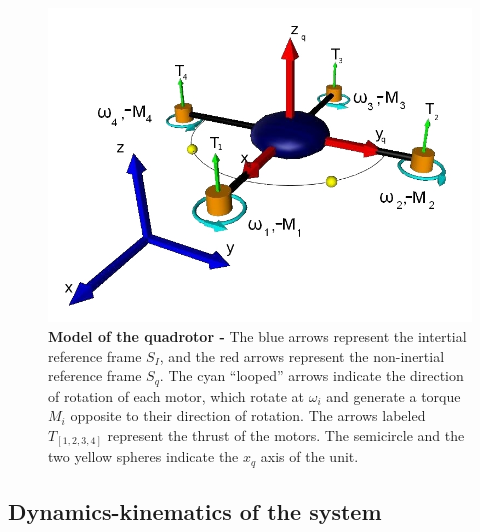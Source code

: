 \documentclass[conference]{IEEEtran}
\begin{document}
\begin{figure}[h!]
	\centering
	\includegraphics[width=.7\columnwidth]{./pics_paper/quad_coord.jpg}
	\vspace{-5pt}
	\caption{\textbf{Model of the quadrotor -} The blue arrows represent the intertial reference frame $S_I$, and the red arrows represent the non-inertial reference frame $S_q$. The cyan ``looped'' arrows indicate the direction of rotation of each motor, which rotate at $\omega_i$ and generate a torque $M_i$ opposite to their direction of rotation. The arrows labeled $T_{[1,2,3,4]}$ represent the thrust of the motors. The semicircle and the two yellow spheres indicate the $x_q$ axis of the unit.}
    \vspace{-10pt}
	\label{fig:quad}
\end{figure}
\subsection{Dynamics-kinematics of the system}
\label{sec:modelo-dyn-kin}
\end{document}
